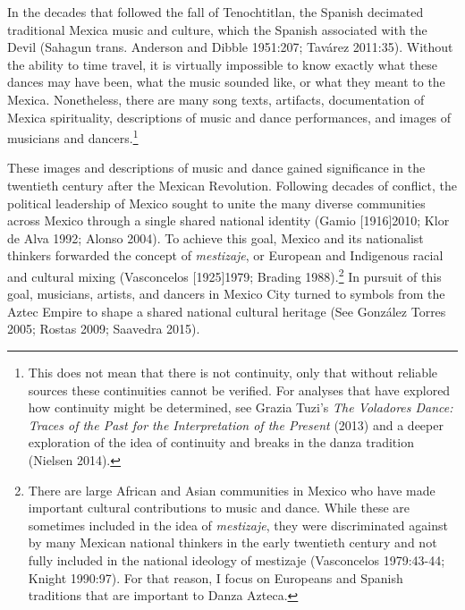 \documentclass{scrartcl}
\begin{document}
In the decades that followed the fall of Tenochtitlan, the Spanish
decimated traditional Mexica music and culture, which the Spanish
associated with the Devil (Sahagun trans. Anderson and Dibble 1951:207;
Tavárez 2011:35). Without the ability to time travel, it is virtually
impossible to know exactly what these dances may have been, what the
music sounded like, or what they meant to the Mexica. Nonetheless, there
are many song texts, artifacts, documentation of Mexica spirituality,
descriptions of music and dance performances, and images of musicians
and dancers.\footnote{This does not mean that there is not continuity,
  only that without reliable sources these continuities cannot be
  verified. For analyses that have explored how continuity might be
  determined, see Grazia Tuzi's \emph{The Voladores Dance: Traces of the
  Past for the Interpretation of the Present} (2013) and a deeper
  exploration of the idea of continuity and breaks in the danza
  tradition (Nielsen 2014).}

These images and descriptions of music and dance gained significance in
the twentieth century after the Mexican Revolution. Following decades of
conflict, the political leadership of Mexico sought to unite the many
diverse communities across Mexico through a single shared national
identity (Gamio {[}1916{]}2010; Klor de Alva 1992; Alonso 2004). To
achieve this goal, Mexico and its nationalist thinkers forwarded the
concept of \emph{mestizaje}, or European and Indigenous racial and
cultural mixing (Vasconcelos {[}1925{]}1979; Brading 1988).\footnote{There
  are large African and Asian communities in Mexico who have made
  important cultural contributions to music and dance. While these are
  sometimes included in the idea of \emph{mestizaje}, they were
  discriminated against by many Mexican national thinkers in the early
  twentieth century and not fully included in the national ideology of
  mestizaje (Vasconcelos 1979:43-44; Knight 1990:97). For that reason, I
  focus on Europeans and Spanish traditions that are important to Danza
  Azteca.} In pursuit of this goal, musicians, artists, and dancers in
Mexico City turned to symbols from the Aztec Empire to shape a shared
national cultural heritage (See González Torres 2005; Rostas 2009;
Saavedra 2015).
\end{document}
